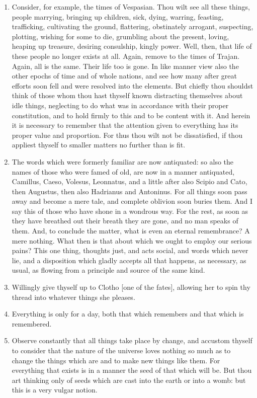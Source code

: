 \begin{enumerate}
\item Consider, for example, the times of Vespasian. Thou wilt see all these things, people marrying, bringing up children, sick, dying, warring, feasting, trafficking, cultivating the ground, flattering, obstinately arrogant, suspecting, plotting, wishing for some to die, grumbling about the present, loving, heaping up treasure, desiring consulship, kingly power. Well, then, that life of these people no longer exists at all. Again, remove to the times of Trajan. Again, all is the same. Their life too is gone. In like manner view also the other epochs of time and of whole nations, and see how many after great efforts soon fell and were resolved into the elements. But chiefly thou shouldst think of those whom thou hast thyself known distracting themselves about idle things, neglecting to do what was in accordance with their proper constitution, and to hold firmly to this and to be content with it. And herein it is necessary to remember that the attention given to everything has its proper value and proportion. For thus thou wilt not be dissatisfied, if thou appliest thyself to smaller matters no further than is fit.

\item The words which were formerly familiar are now antiquated: so also the names of those who were famed of old, are now in a manner antiquated, Camillus, Caeso, Volesus, Leonnatus, and a little after also Scipio and Cato, then Augustus, then also Hadrianus and Antoninus. For all things soon pass away and become a mere tale, and complete oblivion soon buries them. And I say this of those who have shone in a wondrous way. For the rest, as soon as they have breathed out their breath they are gone, and no man speaks of them. And, to conclude the matter, what is even an eternal remembrance? A mere nothing. What then is that about which we ought to employ our serious pains? This one thing, thoughts just, and acts social, and words which never lie, and a disposition which gladly accepts all that happens, as necessary, as usual, as flowing from a principle and source of the same kind.

\item Willingly give thyself up to Clotho [{\clarify one of the fates}], allowing her to spin thy thread into whatever things she pleases.

\item Everything is only for a day, both that which remembers and that which is remembered.

\item Observe constantly that all things take place by change, and accustom thyself to consider that the nature of the universe loves nothing so much as to change the things which are and to make new things like them. For everything that exists is in a manner the seed of that which will be. But thou art thinking only of seeds which are cast into the earth or into a womb: but this is a very vulgar notion.


\end{enumerate}
